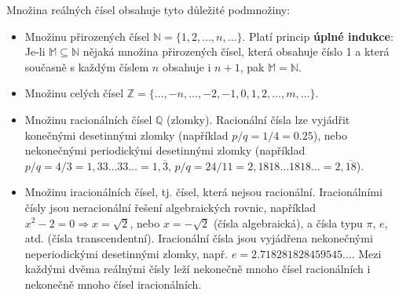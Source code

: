       Množina reálných čísel obsahuje tyto důležité podmnožiny:
      \begin{itemize}
        \item Množinu přirozených čísel \(\mathbb{N} = \{1, 2, \ldots, n, \ldots\}\). Platí princip 
              \textbf{úplné indukce}: Je-li \(\mathbb{M} \subseteq \mathbb{N}\) nějaká množina 
              přirozených čísel, která obsahuje číslo \num{1} a která současně s každým číslem 
              \(n\) obsahuje i \(n + 1\), pak \(\mathbb{M} = \mathbb{N}\).
        \item Množinu celých čísel \(\mathbb{Z} = \{\ldots, -n, \ldots, -2, -1, 0, 1, 2, \ldots, m, 
              \ldots\}\).
        \item Množinu racionálních čísel \(\mathbb{Q}\) (zlomky). Racionální čísla lze vyjádřit 
              konečnými desetinnými zlomky (například \(p/q = 1/4 = \num{0.25}\)), nebo nekonečnými 
              periodickými desetinnými zlomky (například \(p/q = 4/3 = 1,33\ldots33\ldots = 
              1,\overline{3}\), \(p/q = 24/11 = 2,1818\ldots1818\ldots = 2,\overline{18}\)).
        \item Množinu iracionálních čísel, tj. čísel, která nejsou racionální. Iracionálními čísly 
              jsou neracionální řešení algebraických rovnic, například \(x^2 - 2 = 0 \Rightarrow x 
              = \sqrt{2}\), nebo \(x = - \sqrt{2}\) (čísla algebraická), a čísla typu \(\pi\), 
              \(e\), atd. (čísla transcendentní). Iracionální čísla jsou vyjádřena       
              nekonečnými neperiodickými desetinnými zlomky, např. 
              \(e = \num{2.718281828459545}\ldots\). Mezi každými dvěma reálnými čísly leží 
              nekonečně mnoho čísel racionálních i nekonečně mnoho čísel iracionálních.
      \end{itemize}
      
